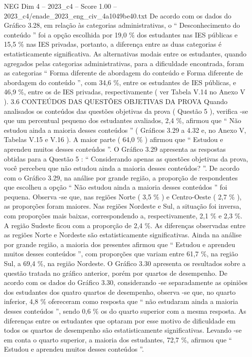 \begin{textsample}{NEG Dim 4 – 2023\_c4 – Score 1.00 – 2023\_c4/enade\_2023\_eng\_civ\_4a1049be40.txt}
De acordo com os dados do Gráfico 3.28, em relação às categorias administrativas, o “ Desconhecimento do conteúdo ” foi a opção escolhida por 19,0 \% dos estudantes nas IES públicas e 15,5 \% nas IES privadas, portanto, a diferença entre as duas categorias é estatisticamente significativa.
As alternativas modais entre os estudantes, quando agregados pelas categorias administrativas, para a dificuldade encontrada, foram as categorias “ Forma diferente de abordagem do conteúdo e Forma diferente de abordagem do conteúdo ”, com 34,6 \%, entre os estudantes de IES públicas, e 46,9 \%, entre os de IES privadas, respectivamente ( ver Tabela V.14 no Anexo V ). 3.6 CONTEÚDOS DAS QUESTÕES OBJETIVAS DA PROVA Quando analisados os conteúdos das questões objetivas da prova ( Questão 5 ), verifica -se que um percentual pequeno dos estudantes avaliados, 2,4 \%, afirmou que “ Não estudou ainda a maioria desses conteúdos ” ( Gráficos 3.29 a 4.32 e, no Anexo V, Tabelas V.15 e V.16 ).
A maior parte ( 64,0 \% ) afirmou que “ Estudou e aprendeu muitos desses conteúdos ”.
O Gráfico 3.29 apresenta as respostas obtidas para a Questão 5 : “ Considerando apenas as questões objetivas da prova, você percebeu que não estudou ainda a maioria desses conteúdos? ”.
De acordo com o Gráfico 3.29, na análise por grande região, a proporção de respondentes que escolheu a opção “ Não estudou ainda a maioria desses conteúdos ” foi pequena.
Observa -se que, nas regiões Norte ( 3,5 \% ) e Centro-Oeste ( 2,7 \% ), as proporções foram maiores.
Nas regiões Nordeste e Sul, a situação foi inversa, com proporções mais baixas, correspondendo a, respectivamente, 2,1 \% e 2,3 \%.
A região Sudeste ficou com a proporção de 2,4 \%.
As diferenças observadas entre as regiões Norte e Nordeste são estatisticamente significativas.
Ainda na análise por grande região, a maioria dos presentes afirmou que “ Estudou e aprendeu muitos desses conteúdos ”, com proporções que variam entre 61,7 \%, na região Sul, a 69,4 \%, na região Nordeste.
O Gráfico 3.30 apresenta os resultados sobre a questão tratada no gráfico anterior, porém por quartos de desempenho.
De acordo com os dados do Gráfico 3.30, considerando -se separadamente as opiniões dos estudantes dos quatro quartos de desempenho, observa -se que, no quarto inferior, 4,8 \% ofereceram como resposta que “ não estudaram ainda a maioria desses conteúdos ”, sendo 0,6 \% os do quarto superior com a mesma resposta.
As diferenças entre os estudantes que optaram por esse motivo de dificuldade em todos os quartos de desempenho são estatisticamente significativas.
Levando -se em conta o quarto superior, a maioria dos estudantes, 72,7 \%, afirmou que “ Estudou e aprendeu muitos desses conteúdos ”.

\end{textsample}
